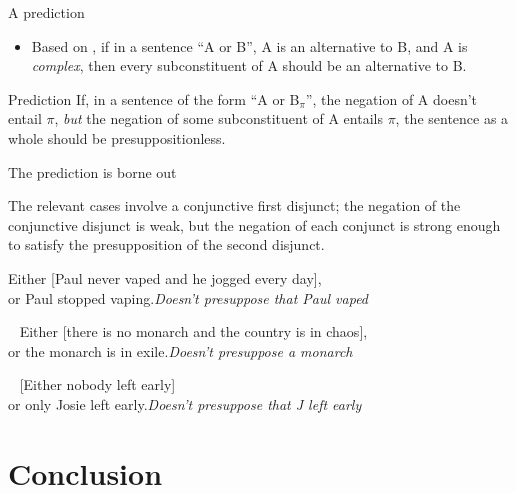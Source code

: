 \documentclass{beamer}
\begin{document}
  \begin{frame}{A prediction}

    \begin{itemize}

    \item Based on \citet{foxKatzir2011}, if in a sentence \enquote{A or B}, A is an alternative to B, and A is \textit{complex}, then every subconstituent of A should be an alternative to B.

    \end{itemize}
    \vspace{3ex}

    \begin{block}{Prediction}
      If, in a sentence of the form \enquote{A or B\(_{π}\)}, the negation of A doesn't entail \(π\), \textit{but} the negation of some subconstituent of A entails \(π\), the sentence as a whole should be presuppositionless.
    \end{block}

  \end{frame}

  \begin{frame}{The prediction is borne out}

    The relevant cases involve a conjunctive first disjunct; the negation of the conjunctive disjunct is weak, but the negation of each conjunct is strong enough to satisfy the presupposition of the second disjunct.

    \ex
    Either {[}\alert{Paul never vaped} and he jogged every day],\\
    or Paul stopped vaping.\hfill\textit{Doesn't presuppose that Paul vaped}
    \xe

    \ex~
    Either {[}\alert{there is no monarch} and the country is in chaos],\\
    or the monarch is in exile.\hfill\textit{Doesn't presuppose a monarch}
    \xe

    \ex~
    {[}\alert{Either nobody left early}]\\
    or only Josie left early.\hfill\textit{Doesn't presuppose that J left early}
    \xe


  \end{frame}

  \section{Conclusion}
\end{document}
